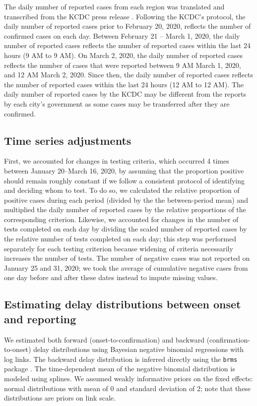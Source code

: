 \documentclass[12pt]{article}
\begin{document}
The daily number of reported cases from each region was translated and transcribed from the KCDC press release \citep{kcdc}.
Following the KCDC's protocol, the daily number of reported cases prior to February 20, 2020, reflects the number of confirmed cases on each day.
Between February 21 -- March 1, 2020, the daily number of reported cases reflects the number of reported cases within the last 24 hours (9 AM to 9 AM).
On March 2, 2020, the daily number of reported cases reflects the number of cases that were reported between 9 AM March 1, 2020, and 12 AM March 2, 2020.
Since then, the daily number of reported cases reflects the number of reported cases within the last 24 hours (12 AM to 12 AM).
The daily number of reported cases by the KCDC may be different from the reports by each city's government as some cases may be transferred after they are confirmed.

\subsection*{Time series adjustments}

First, we accounted for changes in testing criteria, which occurred 4 times between January 20--March 16, 2020, by assuming that the proportion positive should remain roughly constant if we follow a consistent protocol of identifying and deciding whom to test.
To do so, we calculated the relative proportion of positive cases during each period (divided by the the between-period mean) and multiplied the daily number of reported cases by the relative proportions of the corresponding criterion.
Likewise, we accounted for changes in the number of tests completed on each day by dividing the scaled number of reported cases by the relative number of tests completed on each day; this step was performed separately for each testing criterion because widening of criteria necessarily increases the number of tests.
The number of negative cases was not reported on January 25 and 31, 2020; we took the average of cumulative negative cases from one day before and after these dates instead to impute missing values.

\subsection*{Estimating delay distributions between onset and reporting}

We estimated both forward (onset-to-confirmation) and backward (confirmation-to-onset) delay distributions using Bayesian negative binomial regressions with log links.
The backward delay distribution is inferred directly using the \texttt{brms} package \citep{burkner2017brms}.
The time-dependent mean of the negative binomial distribution is modeled using splines.
We assumed weakly informative priors on the fixed effects: normal distributions with mean of 0 and standard deviation of 2;
note that these distributions are priors on link scale.
\end{document}
